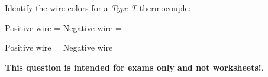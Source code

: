 

Identify the wire colors for a {\it Type T} thermocouple:

\vskip 10pt

Positive wire = \underbar{\hskip 50pt} \hskip 100pt Negative wire = \underbar{\hskip 50pt}







Positive wire =  \hskip 100pt Negative wire = 







{\bf This question is intended for exams only and not worksheets!}.



